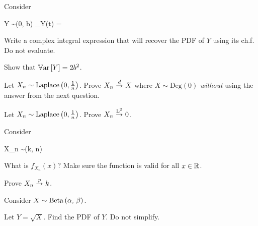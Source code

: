 \documentclass[12pt]{article}
\begin{document}
%
%
%
%
%
\eenum


\problem Consider

\beqn
Y \sim {}(0, b)  \quad {} \quad \phi_Y(t) =  %
\eeqn


\benum
{} Write a complex integral expression that will recover the PDF of $Y$ using its ch.f. Do not evaluate.

 Show that $\mathbb{V}\text{ar}\left[Y\right] = 2b^2$.

 Let $X_n \sim \text{Laplace}\left(0, \frac{1}{n}\right)$. Prove $X_n \convd X$ where $X \sim \text{Deg}(0)$ \textit{without} using the answer from the next question. 

 Let $X_n \sim \text{Laplace}\left(0, \frac{1}{n}\right)$. Prove $X_n \convLp{2} 0 $. 
\eenum

\problem Consider

\beqn
X_n \sim {}(k, n)
\eeqn

\benum
{} What is $f_{X_n}(x)$? Make sure the function is valid for all $x \in \mathbb{R}$.

 Prove $X_n \convp k$. 

\eenum


\problem Consider $X \sim \mathrm{Beta}\left(\alpha,\,\beta\right)$.

\benum
{} Let $Y = \sqrt{X}$. Find the PDF of $Y$. Do not simplify. 
\eenum
\end{document}
